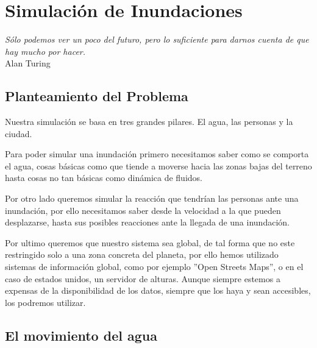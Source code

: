 
\chapter*{Simulación de Inundaciones} \label{cap2}


\begin{flushright}
\begin{minipage}{7.85cm}
    {\em Sólo podemos ver un poco del futuro, pero lo suficiente para darnos
    cuenta de que hay mucho por hacer.} \\  Alan Turing
\end{minipage}
\end{flushright}

\vspace*{5mm}

\section*{Planteamiento del Problema}

Nuestra simulación se basa en tres grandes pilares. El agua, las personas y la
ciudad. 

Para poder simular una inundación primero necesitamos saber como se comporta el
agua, cosas básicas como que tiende a moverse hacia las zonas bajas del terreno
hasta cosas no tan básicas como dinámica de fluidos.

Por otro lado queremos simular la reacción que tendrían las personas ante una
inundación, por ello necesitamos saber desde la velocidad a la que pueden
desplazarse, hasta sus posibles reacciones ante la llegada de una inundación.

Por ultimo queremos que nuestro sistema sea global, de tal forma que no este
restringido solo a una zona concreta del planeta, por ello hemos utilizado
sistemas de información global, como por ejemplo ''Open Streets Maps'', o en
el
caso de estados unidos, un servidor de alturas. Aunque siempre estemos a
expensas de la disponibilidad de los datos, siempre que los haya y sean
accesibles, los podremos utilizar.

\section*{El movimiento del agua}

